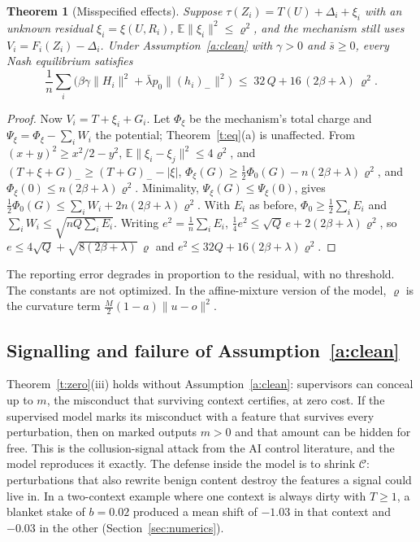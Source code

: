\documentclass[11pt]{article}
\newtheorem{theorem}{Theorem}
\theoremstyle{definition}
\theoremstyle{remark}
\newcommand{\E}{\mathbb{E}}
\newcommand{\cC}{\mathcal{C}}
\newcommand{\norm}[1]{\lVert #1\rVert}
\newcommand{\negp}[1]{(#1)_{-}}
\newcommand{\lbar}{\bar\lambda}
\begin{document}
\begin{theorem}[Misspecified effects]\label{t:mis}
Suppose $\tau(Z_i)=T(U)+\Delta_i+\xi_i$ with an unknown residual $\xi_i=\xi(U,R_i)$, $\E\norm{\xi_i}^2\le\varrho^2$, and the mechanism still uses $V_i=F_i(Z_i)-\Delta_i$. Under Assumption~\ref{a:clean} with $\gamma>0$ and $\bar s\ge 0$, every Nash equilibrium satisfies
\[
\frac1n\sum_i\Big(\beta\gamma\norm{H_i}^2+\lbar p_0\norm{\negp{h_i}}^2\Big)\;\le\;32\,Q+16\,(2\beta+\lambda)\,\varrho^2 .
\]
\end{theorem}
\begin{proof}
Now $V_i=T+\xi_i+G_i$. Let $\Phi_\xi$ be the mechanism's total charge and $\Psi_\xi=\Phi_\xi-\sum_iW_i$ the potential; Theorem~\ref{t:eq}(a) is unaffected. From $(x+y)^2\ge x^2/2-y^2$, $\E\norm{\xi_i-\xi_j}^2\le4\varrho^2$, and $\negp{T+\xi+G}\ge\negp{T+G}-|\xi|$,
$\Phi_\xi(G)\ge\tfrac12\Phi_0(G)-n(2\beta+\lambda)\varrho^2$, and $\Phi_\xi(0)\le n(2\beta+\lambda)\varrho^2$. Minimality, $\Psi_\xi(G)\le\Psi_\xi(0)$, gives $\tfrac12\Phi_0(G)\le\sum_iW_i+2n(2\beta+\lambda)\varrho^2$. With $E_i$ as before, $\Phi_0\ge\frac12\sum_iE_i$ and $\sum_iW_i\le\sqrt{nQ\sum_iE_i}$. Writing $e^2=\frac1n\sum_iE_i$, $\tfrac14e^2\le\sqrt Q\,e+2(2\beta+\lambda)\varrho^2$, so $e\le4\sqrt Q+\sqrt{8(2\beta+\lambda)}\,\varrho$ and $e^2\le32Q+16(2\beta+\lambda)\varrho^2$.
\end{proof}

The reporting error degrades in proportion to the residual, with no threshold. The constants are not optimized. In the affine-mixture version of the model, $\varrho$ is the curvature term $\tfrac M2(1-a)\norm{u-o}^2$.

\subsection{Signalling and failure of Assumption~\ref{a:clean}}\label{sec:signal}

Theorem~\ref{t:zero}(iii) holds without Assumption~\ref{a:clean}: supervisors can conceal up to $m$, the misconduct that surviving context certifies, at zero cost. If the supervised model marks its misconduct with a feature that survives every perturbation, then on marked outputs $m>0$ and that amount can be hidden for free. This is the collusion-signal attack from the AI control literature, and the model reproduces it exactly. The defense inside the model is to shrink $\cC$: perturbations that also rewrite benign content destroy the features a signal could live in. In a two-context example where one context is always dirty with $T\ge1$, a blanket stake of $b=0.02$ produced a mean shift of $-1.03$ in that context and $-0.03$ in the other (Section~\ref{sec:numerics}).
\end{document}
